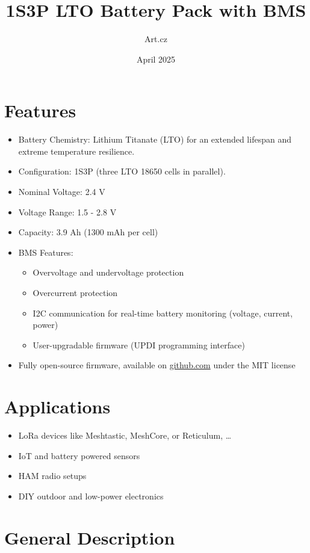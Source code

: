 \documentclass[11pt]{datasheet}
\title{1S3P LTO Battery Pack with BMS}
\author{\textmu{}Art.cz}
\date{April 2025}
\begin{document}
\maketitle

\section{Features}

\begin{itemize}
\item{Battery Chemistry: Lithium Titanate (LTO) for an extended lifespan and extreme }temperature resilience.
\item{Configuration: 1S3P (three LTO 18650 cells in parallel).}
\item{Nominal Voltage: 2.4 V}
\item{Voltage Range: 1.5 - 2.8 V}
\item{Capacity: 3.9 Ah (1300 mAh per cell)}
\item{BMS Features:}
    \begin{itemize}
    \item{Overvoltage and undervoltage protection}
    \item{Overcurrent protection}
    \item{I2C communication for real-time battery monitoring (voltage, current, power)}
    \item{User-upgradable firmware (UPDI programming interface)}
    \end{itemize}
\item{Fully open-source firmware, available on \href{https://github.com/slintak/lto-bms}{github.com} under the MIT license}
\end{itemize}

\section{Applications}

\begin{itemize}
\item{LoRa devices like Meshtastic, MeshCore, or Reticulum, \ldots}
\item{IoT and battery powered sensors}
\item{HAM radio setups}
\item{DIY outdoor and low-power electronics}
\end{itemize}

\vfill\break

\section{General Description}
\end{document}
